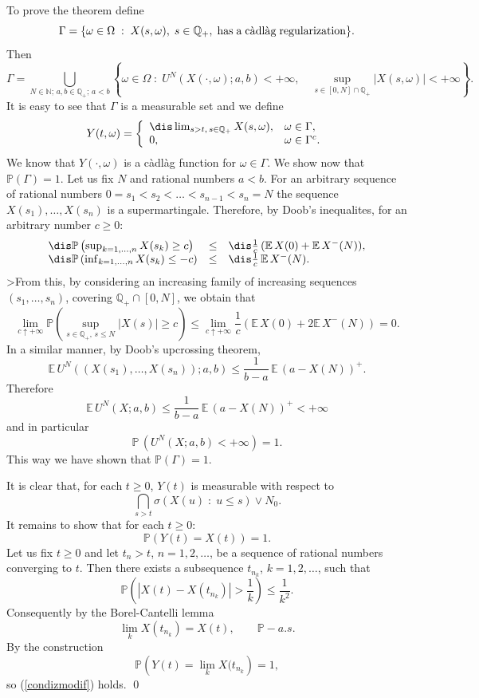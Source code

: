 \documentclass[preprint]{imsart}
\def\P{\mathbb P}
\def\E{\mathbb E}
\def\N{\mathbb N}
\def\Q{\mathbb Q}
\begin{document}
{To prove the theorem define
$$
\Gamma =\{ \omega\in \Omega\; :\; X(s,\omega),\; s\in\Q_+,
{\rm \; has\;a\;
c\grave{a}dl\grave{a}g \; regularization}\}.
$$
Then
$$
\Gamma=\bigcup_{N\in\N;\, a,b\in\Q_+;\, a<b}
\left\{
\omega\in\Omega\;:\; U^N(X(\cdot,\omega);a,b)<+\infty,
\quad \sup_{s\in [0,N]\cap \Q_+} |X(s,\omega)| <+\infty\right\}.
$$
It is easy to see that $\Gamma$ is a measurable set
and we define
$$
Y(t,\omega)= \left\{
\begin{array}{ll}\dis
\lim_{s>t,\, s\in \Q_+}  X(s,\omega), & \omega\in\Gamma,
 \\
  0, & \omega\in\Gamma^c.
\end{array}
\right.
$$
We know that $Y(\cdot,\omega)$ is a c\`adl\`ag  function for
$\omega\in\Gamma$. We show now that $\P(\Gamma)=1$. Let us fix $N$
and rational numbers $a<b$. For an arbitrary sequence of rational
numbers $0=s_1<s_2<\ldots <s_{n-1}<s_n=N$ the sequence
$X(s_1),\ldots,X(s_n)$ is a supermartingale. Therefore, by Doob's
inequalites,  for an arbitrary number $c\ge 0$:
$$
\begin{array}{lll}
  \dis
   \P\left(\sup_{k=1,\ldots, n}X(s_k)\ge c\right)
   &\le&\dis
   \frac{1}{c}\,(\E\,
X(0)+\E\, X^-(N)), \\\dis
\P\left(\inf_{k=1,\ldots, n}X(s_k)\le -c\right)
   &\le&\dis
   \frac{1}{c}\,\E\, X^-(N).
\end{array}
$$
>From this, by considering an increasing family of increasing
sequences $(s_1,\ldots,s_n)$, covering $\Q_+\cap [0,N]$, we obtain
that
$$
\lim_{c\uparrow +\infty}\P\left(
\sup_{s\in\Q_+,\, s\leq N}|X(s)|\ge c\right)
\le
\lim_{c\uparrow +\infty}\frac{1}{c}\left(
\E\,X(0)+2\E\, X^-(N)
\right)=0.
$$
In a similar manner, by Doob's upcrossing theorem,
$$
\E\, U^N((X(s_1),\ldots,X(s_n));a,b)\le
\frac{1}{b-a}\, \E\, (a-X(N))^+.
$$
Therefore
$$
\E\, U^N(X;a,b)\le
\frac{1}{b-a}\, \E\, (a-X(N))^+<+\infty
$$
and in particular
$$
\P\,( U^N(X;a,b)<+\infty)=1.
$$
This way we have shown that $\P(\Gamma)=1$.

It is clear that, for each $t\ge 0$, $Y(t)$ is measurable with
respect to
$$
 \bigcap_{s>t}\sigma (X(u)\; :\; u\le s)\vee N_0.
$$
It remains to show that for each $t\ge0$:
\begin{equation}\label{condizmodif}
  \P(Y(t)=X(t))=1.
\end{equation}
Let us fix $t\ge0$ and let $t_n>t$, $n=1,2,\ldots$, be
 a sequence
of rational numbers converging to $t$. Then there exists a
subsequence $t_{n_k}$, $k=1,2,\ldots$, such that
$$
  \P\left(|X(t)-X(t_{n_k})|>\frac{1}{k}\right)\le\frac{1}{k^2}.
  $$
Consequently by the Borel-Cantelli lemma
$$
  \lim_k X(t_{n_k})=X(t),\qquad \P-a.s.
  $$
By the construction
$$
\P\left( Y(t)= \lim_k X(t_{n_k}\right)=1,
  $$
  so (\ref{condizmodif}) holds.
\qed

}
\end{document}
